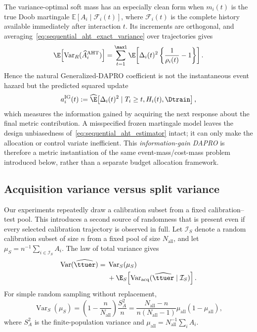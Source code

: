 The variance-optimal soft mass has an especially clean form when $m_i(t)$ is
the true Doob martingale $\mathbb E[A_i\mid\mathcal F_i(t)]$, where
$\mathcal F_i(t)$ is the complete history available immediately after
interaction $t$.  Its increments are orthogonal,
and averaging~\eqref{eq:sequential_aht_exact_variance} over trajectories gives
\begin{equation}
    \E\!\left[
      \operatorname{Var}_R(\widehat A_i^{\mathrm{AHT}})
    \right]
    =\sum_{t=1}^{\maxl}
      \E\!\left[
        \Delta_i(t)^2
        \left\{\frac{1}{\rho_i(t)}-1\right\}
      \right].
    \label{eq:sequential_aht_information_identity}
\end{equation}
Hence the natural Generalized-DAPRO coefficient is not the instantaneous
event hazard but the predicted squared update
\begin{equation}
    a_i^{\mathrm{IG}}(t)
    :=\widehat\E\!\left[
      \Delta_i(t)^2\mid T_i\geq t,H_i(t),\Dtrain
    \right],
    \label{eq:information_gain_mass}
\end{equation}
which measures the information gained by acquiring the next response about
the final metric contribution.  A misspecified frozen martingale model leaves
the design unbiasedness of~\eqref{eq:sequential_aht_estimator} intact; it can
only make the allocation or control variate inefficient.  This
\emph{information-gain DAPRO} is therefore a metric instantiation of the same
event-mass/cost-mass problem introduced below, rather than a separate budget
allocation framework.

\subsection{Acquisition variance versus split variance}

Our experiments repeatedly draw a calibration subset from a fixed
calibration--test pool.  This introduces a second source of randomness that
is present even if every selected calibration trajectory is observed in
full.  Let $\mathcal{I}_S$ denote a random calibration subset of size $n$ from
a fixed pool of size $N_{\mathrm{all}}$, and let
$\mu_S=n^{-1}\sum_{i\in\mathcal{I}_S}A_i$.  The law of total variance gives
\begin{equation}
\begin{split}
    \operatorname{Var}(\widehat{\ttuer})
    ={}&\operatorname{Var}_S(\mu_S)\\
    &+\E_S\!\left[
    \operatorname{Var}_{\mathrm{acq}}
    (\widehat{\ttuer}\mid\mathcal{I}_S)
    \right].
    \label{eq:split_acquisition_variance}
\end{split}
\end{equation}
For simple random sampling without replacement,
\begin{equation}
    \operatorname{Var}_S(\mu_S)
    =\left(1-\frac{n}{N_{\mathrm{all}}}\right)
      \frac{S_A^2}{n}
    =\frac{N_{\mathrm{all}}-n}{n(N_{\mathrm{all}}-1)}
      \mu_{\mathrm{all}}(1-\mu_{\mathrm{all}}),
    \label{eq:split_variance_binary}
\end{equation}
where $S_A^2$ is the finite-population variance and
$\mu_{\mathrm{all}}=N_{\mathrm{all}}^{-1}\sum_iA_i$.

